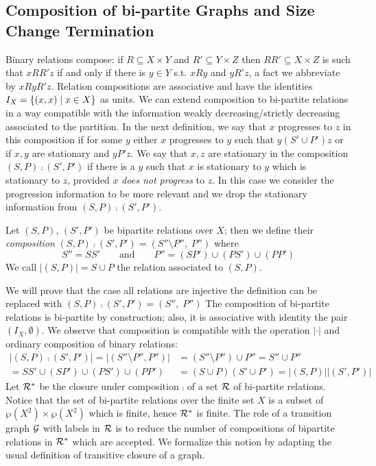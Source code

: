 \subsection{Composition of bi-partite Graphs and Size Change Termination}

Binary relations compose: if $R \subseteq X \times Y$ and 
$R' \subseteq Y \times Z$ then $RR' \subseteq X \times Z$ is such that
$xRR'z$ if and only if there is $y \in Y$ s.t. $xRy$ and $yR'z$, a fact 
we abbreviate by $xRyR'z$. Relation compositions are associative 
and have the identities $I_X = \{ (x,x) \mid x \in X \}$ as units. We can extend composition
to bi-partite relations in a way compatible with the information weakly decreasing/strictly
decreasing associated to the partition. 
In the next definition, we say that $x$ progresses to $z$ in this composition if for some $y$ either $x$ progresses to $y$ such that $y(S' \cup P')z$ or if $x,y$ are stationary and $yP'z$. We say that $x,z$ are stationary in the composition $(S, P) \comp (S', P')$ if there is a $y$ such that $x$ is stationary to $y$ which is stationary to $z$, provided $x$ \emph{does not progress} to $z$. In
this case we consider the progression information to be more relevant and we drop
the stationary information from $(S, P) \comp (S', P')$.

\begin{definition}\label{def:bi-partiteRelations}
Let $(S,P)$, $(S',P')$ be bipartite relations over $X$; then we define their {\em composition} $(S, P) \comp (S', P') = (S'' \setminus P'',\; P'')$
where
\[S'' = S S' \qquad \mbox{and} \qquad P'' = (S P') \cup (P S') \cup (P P') \]
We call $|(S,P)| = S \cup P$ the relation associated to $(S,P)$.
\end{definition}

We will prove that the case all relations are injective the definition
can be replaced with $(S, P) \comp (S', P') = (S'', \; P'')$
The composition of bi-partite relations is bi-partite by construction; also, it is associative
with identity the pair $(I_X, \emptyset)$.
We observe that composition is compatible with the operation 
$|\cdot|$ and ordinary composition of binary relations: 
\begin{align}
\label{eq:unionComp}
|(S,P) \comp (S',P')| = |(S'' \setminus P'', P'')| &= (S''\setminus P'') \cup P''  
= S'' \cup P''  \nonumber \\ = SS' \cup  (S P') \cup (P S') \cup (P P')
& = (S \cup P) (S' \cup P') = |(S,P)| |(S',P')|
\end{align}
Let $\mathcal{R}^*$ be the closure under composition $\comp$ of a set $\mathcal{R}$ of bi-partite relations. Notice that the set of bi-partite relations over the finite set $X$
is a subset of $\wp(X^2) \times \wp(X^2)$ which is finite, hence $\mathcal{R}^*$ is finite.
The role of a transition graph $\mathcal{G}$ with labels in $\mathcal{R}$ is to reduce the number of
 compositions of bipartite relations in $\mathcal{R}^*$ which are accepted. We formalize this notion
by adapting the usual definition of transitive closure of a graph.

